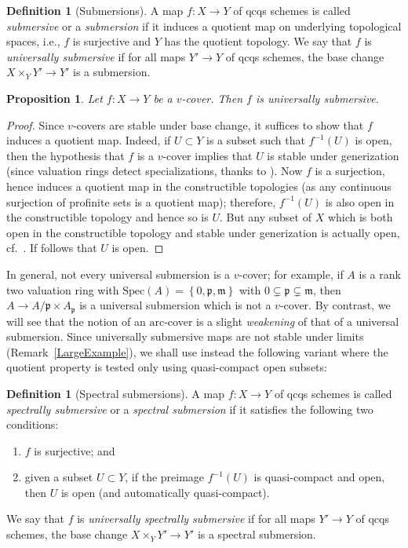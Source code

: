 \documentclass[reqno]{amsart}
\newcommand{\spec}{\mathrm{Spec}}
\newcommand{\arc}{\mathrm{arc}}
\newcommand{\cl}{\colon}
\newtheorem{proposition}[theorem]{Proposition}
\theoremstyle{definition}
\newtheorem{definition}[theorem]{Definition}
\begin{document}
\begin{definition}[Submersions]
A map $f \cl X \to Y$ of qcqs schemes is called \emph{submersive} or a
\emph{submersion}
if it induces a quotient map on underlying topological spaces, i.e., $f$ is
surjective and $Y$ has the quotient topology. We say that $f$
is \emph{universally submersive} if 
for all maps $Y' \to Y$ of qcqs schemes, the base change 
$X \times_Y Y' \to Y'$
is a submersion. 
\end{definition} 

\begin{proposition} 
Let $f \colon X \to Y$ be a $v$-cover. 
Then $f$ is universally submersive. 
\end{proposition} 
\begin{proof} 
Since $v$-covers are stable under base change, it suffices to show that $f$
induces a quotient map. 
Indeed, if $U \subset Y$ is a subset such that $f^{-1}(U)$ is open, then the
hypothesis that $f$ is a $v$-cover implies that $U$ is stable under
generization (since valuation rings detect specializations, thanks to \cite[Tag 00IA]{stacks-project}). 
Now $f$ is a surjection, hence induces a quotient map in the constructible
topologies 
(as any continuous surjection of profinite sets is a quotient map); therefore, $f^{-1}(U)$ is also open in the constructible topology
and hence so is $U$. 
But any subset of $X$ which is both open in the constructible topology and
stable under generization is actually open, cf.~\cite[Tag 0903]{stacks-project}. 
If follows that $U$ is open. 
\end{proof} 


In general, not every universal submersion is a $v$-cover; for example, 
if $A$ is a rank two valuation ring with 
$\spec(A) = \left\{0 , \mathfrak{p}, \mathfrak{m}\right\}$ with $0 \subsetneq
\mathfrak{p} \subsetneq \mathfrak{m}$, then $A \to A/\mathfrak{p} \times
A_{\mathfrak{p}}$ is a universal submersion \cite[Prop.~32]{Pic} which is
not a $v$-cover. 
By contrast, we will see that the notion of an $\arc$-cover is a slight
\emph{weakening} of that of a universal submersion. 
 Since universally submersive maps are not stable under limits (Remark~\ref{LargeExample}), we shall use instead the following variant where the quotient property is tested only using quasi-compact open subsets:

\begin{definition}[Spectral submersions] 
\label{SpectralSubmDef}
A map $f\colon X \to Y$ of qcqs schemes is called {\em spectrally submersive} or a {\em spectral submersion} if it satisfies the following two conditions:
\begin{enumerate}
\item $f$ is surjective; and 
\item given a subset $U \subset Y$, if the preimage $f^{-1}(U)$ is
quasi-compact and open, then $U$ is  open (and automatically quasi-compact).
\end{enumerate}
We say that $f$ is {\em universally spectrally submersive} if for all maps $Y'
\to Y$ of qcqs schemes, the base change $X \times_Y Y' \to Y'$ is a spectral submersion. 
\end{definition}
\end{document}
